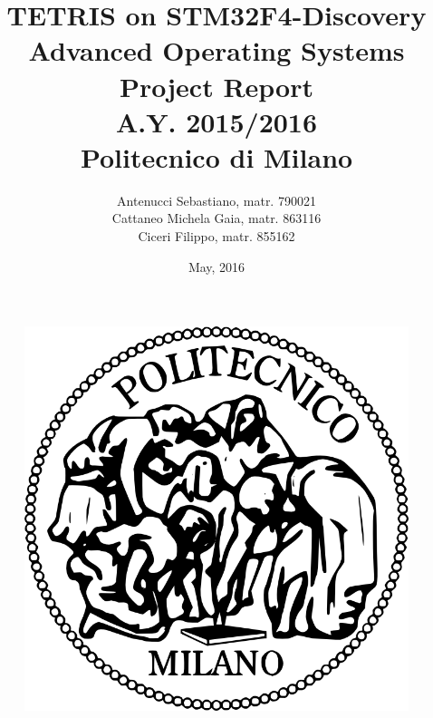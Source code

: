 \documentclass[18pt,oneside,a4paper, titlepage]{article}
\begin{document}
\begin{figure}[t]
	\centering
	\includegraphics[scale=0.35]{logo-polimi.png}
\end{figure}
\title{\textbf{TETRIS on STM32F4-Discovery}\\Advanced Operating Systems Project Report\\ A.Y. 2015/2016\\
	Politecnico di Milano}	
\author{Antenucci Sebastiano, matr. 790021\\Cattaneo Michela Gaia, matr. 863116\\Ciceri Filippo, matr. 855162 }
\date{May, 2016}
\maketitle

\newpage
	\tableofcontents

\newpage
\end{document}

